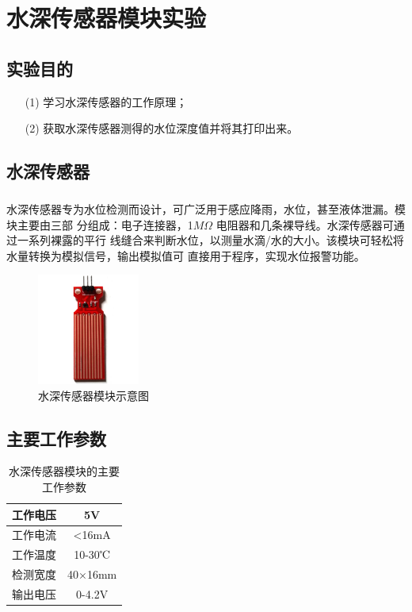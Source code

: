 \documentclass[UTF8, oneside]{ctexbook}
\begin{document}
\chapter{水深传感器模块实验}

\section{实验目的}
\begin{itemize}
    \item[(1)] 学习水深传感器的工作原理；
    \item[(2)] 获取水深传感器测得的水位深度值并将其打印出来。
\end{itemize}

\section{水深传感器}
\paragraph{}
水深传感器专为水位检测而设计，可广泛用于感应降雨，水位，甚至液体泄漏。模块主要由三部
分组成：电子连接器，1$M\Omega$ 电阻器和几条裸导线。水深传感器可通过一系列裸露的平行
线缝合来判断水位，以测量水滴/水的大小。该模块可轻松将水量转换为模拟信号，输出模拟值可
直接用于程序，实现水位报警功能。

\begin{figure}[h]
    \centering
    \includegraphics[width=0.3\textwidth]{./result/sensor/15/sensor.png}
    \caption{水深传感器模块示意图}
    \label{15_sensor}
\end{figure}

\section{主要工作参数}
\newpage
\begin{table}[h]
    \centering
    \begin{tabular}{|c|c|}
    \hline
    工作电压 & 5V              \\ \hline
    工作电流 & \textless{}16mA \\ \hline
    工作温度 & 10-30℃          \\ \hline
    检测宽度 & 40$\times$16mm  \\ \hline
    输出电压 & 0-4.2V          \\ \hline
    \end{tabular}
    \caption{水深传感器模块的主要工作参数}
\end{table}
\end{document}
